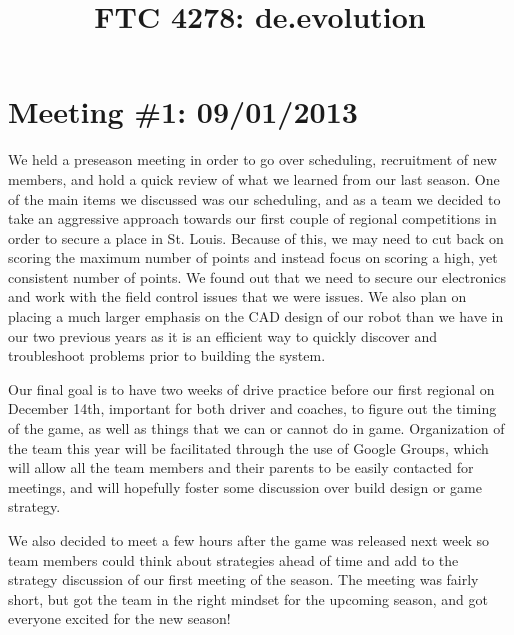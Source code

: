 \documentclass{article}
\title{FTC 4278: de.evolution}
\date{}
\begin{document}
\maketitle
\tableofcontents
\newpage
\section{Meeting \#1: 09/01/2013}
We held a preseason meeting in order to go over scheduling, recruitment of new members, and hold a quick review of what we learned from our last season. One of the main items we discussed was our scheduling, and as a team we decided to take an aggressive approach towards our first couple of regional competitions in order to secure a place in St. Louis. Because of this, we may need to cut back on scoring the maximum number of points and instead focus on scoring a high, yet consistent number of points. We found out that we need to secure our electronics and work with the field control issues that we were issues. We also plan on placing a much larger emphasis on the CAD design of our robot than we have in our two previous years as it is an efficient way to quickly discover and troubleshoot problems prior to building the system. 

Our final goal is to have two weeks of drive practice before our first regional on December 14th, important for both driver and coaches, to figure out the timing of the game, as well as things that we can or cannot do in game. Organization of the team this year will be facilitated through the use of Google Groups, which will allow all the team members and their parents to be easily contacted for meetings, and will hopefully foster some discussion over build design or game strategy. 

We also decided to meet a few hours after the game was released next week so team members could think about strategies ahead of time and add to the strategy discussion of our first meeting of the season. The meeting was fairly short, but got the team in the right mindset for the upcoming season, and got everyone excited for the  new season!
\end{document}
